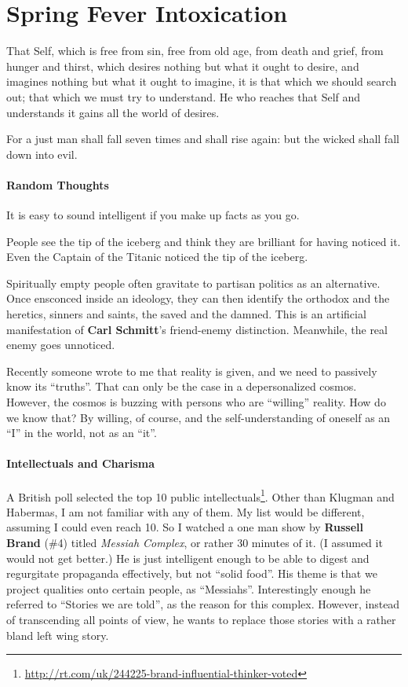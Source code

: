 \section{Spring Fever Intoxication}

\begin{quotex}
That Self, which is free from sin, free from old age, from death and grief, from hunger and thirst, which desires nothing but what it ought to desire, and imagines nothing but what it ought to imagine, it is that which we should search out; that which we must try to understand. He who reaches that Self and understands it gains all the world of desires.

For a just man shall fall seven times and shall rise again: but the wicked shall fall down into evil.
\end{quotex}


\paragraph{Random Thoughts}


It is easy to sound intelligent if you make up facts as you go.

People see the tip of the iceberg and think they are brilliant for having noticed it. Even the Captain of the Titanic noticed the tip of the iceberg.

Spiritually empty people often gravitate to partisan politics as an alternative. Once ensconced inside an ideology, they can then identify the orthodox and the heretics, sinners and saints, the saved and the damned. This is an artificial manifestation of \textbf{Carl Schmitt}'s friend-enemy distinction. Meanwhile, the real enemy goes unnoticed.

Recently someone wrote to me that reality is given, and we need to passively know its ``truths''. That can only be the case in a depersonalized cosmos. However, the cosmos is buzzing with persons who are ``willing'' reality. How do we know that? By willing, of course, and the self-understanding of oneself as an ``I'' in the world, not as an ``it''.

\paragraph{Intellectuals and Charisma}


A British poll selected the top 10 public intellectuals\footnote{\url{http://rt.com/uk/244225-brand-influential-thinker-voted}}. Other than Klugman and Habermas, I am not familiar with any of them. My list would be different, assuming I could even reach 10. So I watched a one man show by \textbf{Russell Brand} (\#4) titled \emph{Messiah Complex}, or rather 30 minutes of it. (I assumed it would not get better.) He is just intelligent enough to be able to digest and regurgitate propaganda effectively, but not ``solid food''. His theme is that we project qualities onto certain people, as ``Messiahs''. Interestingly enough he referred to ``Stories we are told'', as the reason for this complex. However, instead of transcending all points of view, he wants to replace those stories with a rather bland left wing story.

